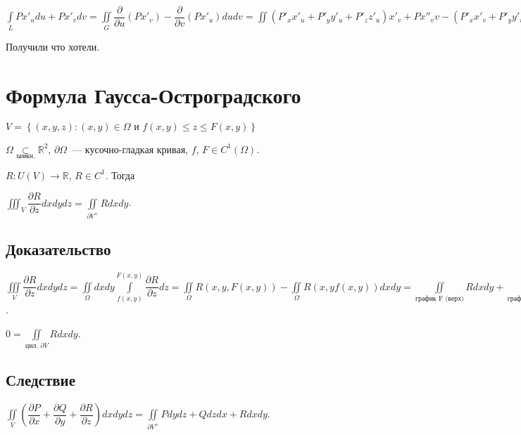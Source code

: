 \documentclass{article}
\begin{document}
            $\int\limits_L P x'_u du + P x'_v dv = \iint\limits_G \dfrac{\partial}{\partial u} (P x'_v) - \dfrac{\partial}{\partial v} (P x'_u) du dv = \iint \left( P'_x x'_u + P'_y y'_u + P'_z z'_u \right) x'_v + P x''_vv - \left(P'_x x'_v + P'_y y'_v + P'_y z'_v \right) x'_u - P x''_uv du dv = \iint P'_x \mathbf{0} + P'_y (x'_v y'_u - x'_u y'_v) + P'_z (x'_v z'_u - x'_u z'_v) = \iint\limits_{G} P'_z dzdx - P'_y dxdy$
            
            Получили что хотели.
            
    \newpage
    
    \section{Формула Гаусса-Остроградского}
    
        $V = \left\{ (x, y, z) : (x, y) \in \Omega \text{ и } f(x, y) \leqslant z \leqslant F(x, y) \right\}$
        
        $\Omega\underset{\text{замкн.}} \subset \mathbb{R}^2$, $\partial \Omega$~--- кусочно-гладкая кривая, $f$, $F \in C^1 \left( \Omega \right)$.
        
        $R : U(V) \rightarrow \mathbb{R}$, $R \in C^1$. Тогда
        
        $\iiint_V \dfrac{\partial R}{\partial z} dx dy dz = \iint\limits_{\partial V^+} R dx dy$.
        
        \subsection{Доказательство}
        
            $\iiint\limits_V \dfrac{\partial R}{\partial z} dx dy dz = \iint\limits_{\Omega} dx dy \int\limits_{f(x, y)}^{F(x, y)} \dfrac{\partial R}{\partial z} dz = \iint\limits_{\Omega} R(x, y, F(x, y)) - \iint\limits_{\Omega} R(x, y f(x, y)) dx dy = \iint\limits_{\text{график F (верх)}} R dx dy + \iint\limits_{\text{график f (низ)}} R dx dy$.
            
            $0 = \iint\limits_{\text{цил. } \partial V} R dx dy$.
        
        \subsection{Следствие}
        
            $\iint\limits_V \left( \dfrac{\partial P}{\partial x} + \dfrac{\partial Q}{\partial y} + \dfrac{\partial R}{\partial z} \right) dx dy dz = \iint\limits_{\partial V^+} P dydz + Q dzdx + R dxdy$.
    
\end{document}
